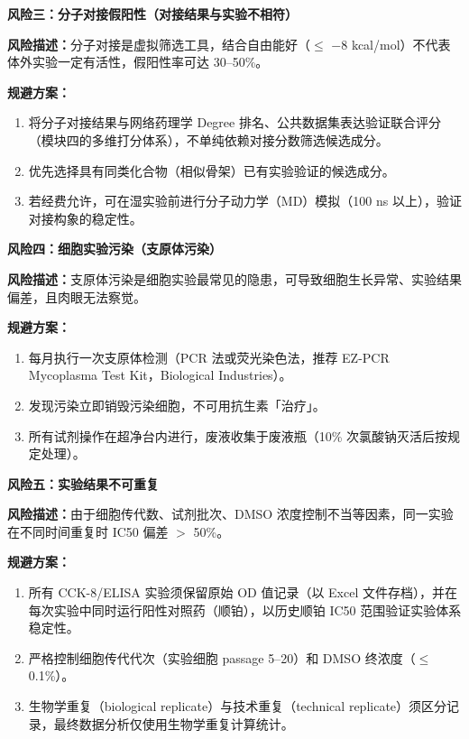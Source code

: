 \documentclass[12pt,a4paper,twoside]{article}
\begin{document}
\begin{warningbox}
\textbf{风险三：分子对接假阳性（对接结果与实验不相符）}

\textbf{风险描述：}分子对接是虚拟筛选工具，结合自由能好（$\leq$ $-$8 kcal/mol）不代表体外实验一定有活性，假阳性率可达 30--50\%。

\textbf{规避方案：}
\begin{enumerate}
  \item 将分子对接结果与网络药理学 Degree 排名、公共数据集表达验证联合评分（模块四的多维打分体系），不单纯依赖对接分数筛选候选成分。
  \item 优先选择具有同类化合物（相似骨架）已有实验验证的候选成分。
  \item 若经费允许，可在湿实验前进行分子动力学（MD）模拟（100 ns 以上），验证对接构象的稳定性。
\end{enumerate}
\end{warningbox}

\begin{warningbox}
\textbf{风险四：细胞实验污染（支原体污染）}

\textbf{风险描述：}支原体污染是细胞实验最常见的隐患，可导致细胞生长异常、实验结果偏差，且肉眼无法察觉。

\textbf{规避方案：}
\begin{enumerate}
  \item 每月执行一次支原体检测（PCR 法或荧光染色法，推荐 EZ-PCR Mycoplasma Test Kit，Biological Industries）。
  \item 发现污染立即销毁污染细胞，不可用抗生素「治疗」。
  \item 所有试剂操作在超净台内进行，废液收集于废液瓶（10\% 次氯酸钠灭活后按规定处理）。
\end{enumerate}
\end{warningbox}

\begin{warningbox}
\textbf{风险五：实验结果不可重复}

\textbf{风险描述：}由于细胞传代数、试剂批次、DMSO 浓度控制不当等因素，同一实验在不同时间重复时 IC50 偏差 $>$ 50\%。

\textbf{规避方案：}
\begin{enumerate}
  \item 所有 CCK-8/ELISA 实验须保留原始 OD 值记录（以 Excel 文件存档），并在每次实验中同时运行阳性对照药（顺铂），以历史顺铂 IC50 范围验证实验体系稳定性。
  \item 严格控制细胞传代代次（实验细胞 passage 5--20）和 DMSO 终浓度（$\leq$ 0.1\%）。
  \item 生物学重复（biological replicate）与技术重复（technical replicate）须区分记录，最终数据分析仅使用生物学重复计算统计。
\end{enumerate}
\end{warningbox}
\end{document}
